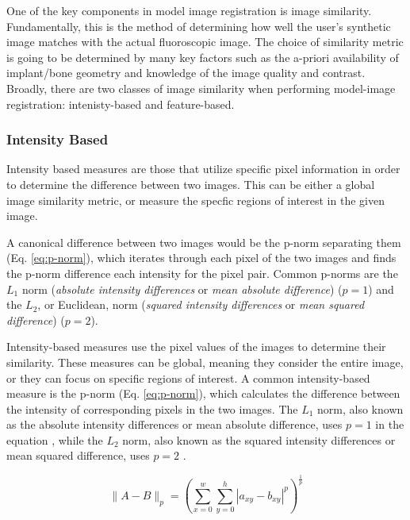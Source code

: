 One of the key components in model image registration is image similarity. Fundamentally, this is the method of determining how well the user's synthetic image matches with the actual fluoroscopic image. The choice of similarity metric is going to be determined by many key factors such as the a-priori availability of implant/bone geometry and knowledge of the image quality and contrast. Broadly, there are two classes of image similarity when performing model-image registration: intenisty-based and feature-based.

\subsubsection{Intensity Based}
\label{sec:img-sim-intensity}
Intensity based measures are those that utilize specific pixel information in order to determine the difference between two images. This can be either a global image similarity metric, or measure the specfic regions of interest in the given image. 

A canonical difference between two images would be the p-norm separating them (Eq. \ref{eq:p-norm}), which iterates through each pixel of the two images and finds the p-norm difference each intensity for the pixel pair. Common p-norms are the $L_1$ norm (\emph{absolute intensity differences} or \emph{mean absolute difference}) \cite{kanadeStereoMatchingAlgorithm1994} ($p=1$) and the $L_{2}$, or Euclidean, norm (\emph{squared intensity differences} or \emph{mean squared difference}) \cite{hannahComputerMatchingAreas1977}($p=2$).

Intensity-based measures use the pixel values of the images to determine their similarity. These measures can be global, meaning they consider the entire image, or they can focus on specific regions of interest. A common intensity-based measure is the p-norm (Eq. \ref{eq:p-norm}), which calculates the difference between the intensity of corresponding pixels in the two images. The $L_1$ norm, also known as the absolute intensity differences or mean absolute difference, uses $p=1$ in the equation \cite{kanadeStereoMatchingAlgorithm1994}, while the $L_2$ norm, also known as the squared intensity differences or mean squared difference, uses $p=2$ \cite{hannahComputerMatchingAreas1977}. 

\begin{equation}
    \|A-B\|_{p} = (\sum_{x=0}^{w}\sum_{y=0}^{h}|a_{xy}-b_{xy}|^{p})^{\frac{1}{p}}
    \label{eq:p-norm}
\end{equation}

